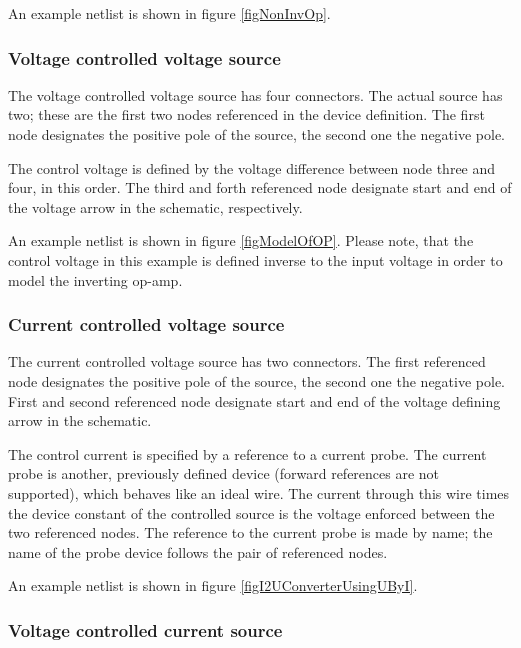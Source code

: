 An example netlist is shown in figure \ref{figNonInvOp}.


\subsubsection{Voltage controlled voltage source }

The voltage controlled voltage source  has four connectors. The
actual source has two; these are the first two nodes referenced in the
device definition. The first node designates the positive pole of the
source, the second one the negative pole.

The control voltage is defined by the voltage difference between
node three and four, in this order. The third and forth referenced node
designate start and end of the voltage arrow in the schematic,
respectively.

An example netlist is shown in figure \ref{figModelOfOP}. Please note,
that the control voltage in this example is defined inverse to the input
voltage in order to model the inverting op-amp.


\subsubsection{Current controlled voltage source }

The current controlled voltage source  has two connectors. The
first referenced node designates the positive pole of the source, the
second one the negative pole. First and second referenced
node designate start and end of the voltage defining arrow in the
schematic.

The control current is specified by a reference to a current probe. The
current probe is another, previously defined device (forward references
are not supported), which behaves like an ideal wire. The current through
this wire times the device constant of the controlled source is the
voltage enforced between the two referenced nodes. The reference to the
current probe is made by name; the name of the probe device follows the
pair of referenced nodes.

An example netlist is shown in figure \ref{figI2UConverterUsingUByI}.


\subsubsection{Voltage controlled current source }

